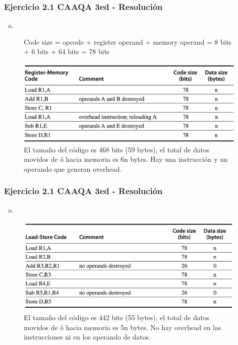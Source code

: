 \documentclass{beamer}
\begin{document}
 \begin{frame}
 \frametitle{Ejercicio 2.1 CAAQA 3ed - Resolución}
 \begin{enumerate}[b.]
 \item
\end{enumerate}
\begin{center}
\begin{figure}
\caption*{Code size = opcode + register operand + memory  operand = 8 bits + 6 bits + 64 bits = 78 bits}
 \includegraphics[scale=.45,keepaspectratio=true]{Ejercicio21b3.png}
 \caption*{El tamaño del código es 468 bits (59 bytes), el total de datos movidos de ó hacia memoria es 6n bytes. Hay una instrucción y un operando que generan overhead.}
\end{figure}
\end{center}
 \end{frame}

 
 \begin{frame}
 \frametitle{Ejercicio 2.1 CAAQA 3ed - Resolución}
 \begin{enumerate}[b.]
 \item
\end{enumerate}
\begin{center}
\begin{figure}
 \includegraphics[scale=.45,keepaspectratio=true]{Ejercicio21b4.png}
 \caption*{El tamaño del código es  442 bits (55 bytes), el total de datos movidos de ó hacia memoria es 5n bytes. No hay overhead en las instrucciones ni en los operando de datos.}
\end{figure}
\end{center}
 \end{frame}
\end{document}
